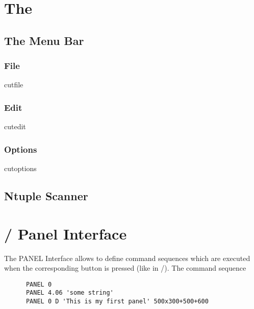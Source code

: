 \section{The \CE}


\subsection{The \CE{} Menu Bar}

\subsubsection{File}

\begin{PAWf}{cutfile}
\end{PAWf}

\subsubsection{Edit}

\begin{PAWf}{cutedit}
\end{PAWf}

\subsubsection{Options}

\begin{PAWf}{cutoptions}
\end{PAWf}

\subsection{Ntuple Scanner}



\section{\KUIP/\MOTIF{} Panel Interface}

   The PANEL Interface allows to define command sequences which are executed
   when the corresponding button is pressed (like  in \XPAW/\Xxi).
   The command sequence

\begin{verbatim}
      PANEL 0
      PANEL 4.06 'some string'
      PANEL 0 D 'This is my first panel' 500x300+500+600
\end{verbatim}

